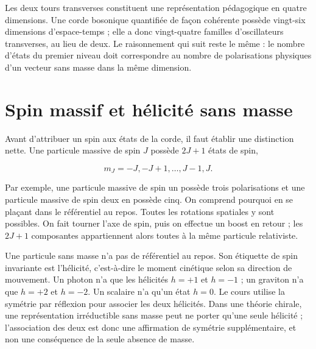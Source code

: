 Les deux tours transverses constituent une représentation pédagogique en quatre dimensions. Une corde bosonique quantifiée de façon cohérente possède vingt-six dimensions d’espace-temps ; elle a donc vingt-quatre familles d’oscillateurs transverses, au lieu de deux. Le raisonnement qui suit reste le même : le nombre d’états du premier niveau doit correspondre au nombre de polarisations physiques d’un vecteur sans masse dans la même dimension.

\section{Spin massif et hélicité sans masse}

Avant d’attribuer un spin aux états de la corde, il faut établir une distinction nette. Une particule massive de spin \(J\) possède \(2J+1\) états de spin,

\begin{equation}
  m_J=-J,-J+1,\ldots,J-1,J.
  \label{eq:l03-massive-spin-multiplet}
\end{equation}

Par exemple, une particule massive de spin un possède trois polarisations et une particule massive de spin deux en possède cinq. On comprend pourquoi en se plaçant dans le référentiel au repos. Toutes les rotations spatiales y sont possibles. On fait tourner l’axe de spin, puis on effectue un boost en retour ; les \(2J+1\) composantes appartiennent alors toutes à la même particule relativiste.

Une particule sans masse n’a pas de référentiel au repos. Son étiquette de spin invariante est l’hélicité, c’est-à-dire le moment cinétique selon sa direction de mouvement. Un photon n’a que les hélicités \(h=+1\) et \(h=-1\) ; un graviton n’a que \(h=+2\) et \(h=-2\). Un scalaire n’a qu’un état \(h=0\). Le cours utilise la symétrie par réflexion pour associer les deux hélicités. Dans une théorie chirale, une représentation irréductible sans masse peut ne porter qu’une seule hélicité ; l’association des deux est donc une affirmation de symétrie supplémentaire, et non une conséquence de la seule absence de masse.

